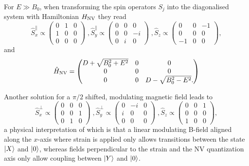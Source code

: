For $E \gg B_0$, when transforming the spin operators $S_j$ into the diagonalised system with Hamiltonian $H_{\ce{NV}}$ they read 
\begin{equation}
    \hat{S}_x^\parallel \propto \begin{pmatrix}
        0 & 1 & 0 \\ 
        1 & 0 & 0 \\ 
        0 & 0 & 0 
    \end{pmatrix} \; , 
    \hat{S}_y^\parallel \propto \begin{pmatrix}
        0 & 0 & 0 \\ 
        0 & 0 & -i \\ 
        0 & i & 0 
    \end{pmatrix} \; , 
    \hat{S}_z \propto \begin{pmatrix}
        0 & 0 & -1 \\ 
        0 & 0 & 0 \\ 
        -1 & 0 & 0 
    \end{pmatrix} , 
    \label{eq:diagonalised_spin_operators}
\end{equation}
and 
\begin{equation}
    \hat{H}_{\ce{NV}} = \begin{pmatrix}
        D + \sqrt{B_0^2 + E^2} & 0 & 0 \\ 
        0 & 0 & 0 \\ 
        0 & 0 & D - \sqrt{B_0^2 - E^2}. 
    \end{pmatrix} 
\end{equation}

Another solution for a $\pi/2$ shifted, modulating magnetic field leads to 
\begin{equation}
    \hat{S}_x^\perp \propto \begin{pmatrix}
        0 & 0 & 0 \\ 
        0 & 0 & 1 \\ 
        0 & 1 & 0 
    \end{pmatrix} \; , 
    \hat{S}_y^\perp \propto \begin{pmatrix}
        0 & -i & 0 \\ 
        i & 0 & 0 \\ 
        0 & 0 & 0 
    \end{pmatrix} \; , 
    \hat{S}_z \propto \begin{pmatrix}
        0 & 0 & 1 \\ 
        0 & 0 & 0 \\ 
        1 & 0 & 0 
    \end{pmatrix} , 
    \label{eq:diagonalised_spin_operators}
\end{equation}
a physical interpretation of which is that a linear modulating B-field aligned
along the $x$-axis where strain is applied only allows transitions between the state
$\ket{X}$ and $\ket{0}$, whereas fields perpendicular to the strain and the NV quantization axis
only allow coupling between $\ket{Y}$ and $\ket{0}$.

